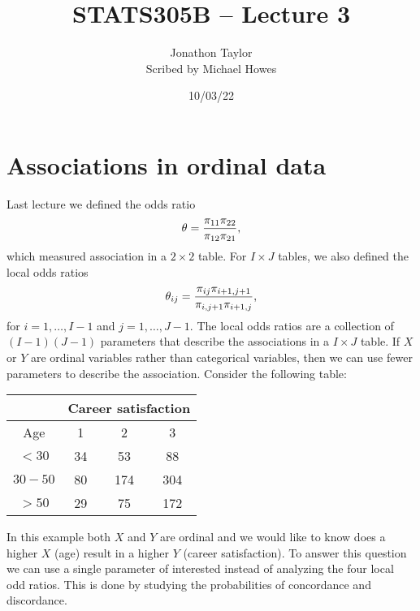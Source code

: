 




\title{STATS305B -- Lecture 3}
\author{Jonathon Taylor\\ Scribed by Michael Howes}
\date{10/03/22}

\pagestyle{fancy}
\fancyhf{}


\maketitle
\tableofcontents
\section{Associations in ordinal data}
Last lecture we defined the odds ratio
\[{\theta} = \frac{\pi_{11}\pi_{22}}{\pi_{12}\pi_{21}},\]
which measured association in a $2\times 2$ table. For $I \times J$ tables, we also defined the local odds ratios
\[{\theta}_{ij} =  \frac{\pi_{ij}\pi_{i+1,j+1}}{\pi_{i,j+1}\pi_{i+1,j}}, \]
for $i = 1,\ldots,I-1$ and $j=1,\ldots,J-1$. The local odds ratios are a collection of $(I-1)(J-1)$ parameters that describe the associations in a $I \times J$ table. If $X$ or $Y$ are ordinal variables rather than categorical variables, then we can use fewer parameters to describe the association. Consider the following table:
\begin{center}
    \begin{tabular}{c|ccc}
        &\multicolumn{3}{c}{Career satisfaction}\\
        \hline 
        Age&1&2&3\\
        \hline
        $<30$&34&53&88\\
        $30-50$&80&174&304\\
        $>50$&29&75&172
    \end{tabular}
\end{center}
In this example both $X$ and $Y$ are ordinal and we would like to know does a higher $X$ (age) result in a higher $Y$ (career satisfaction). To answer this question we can use a single parameter of interested instead of analyzing the four local odd ratios. This is done by studying the probabilities of concordance and discordance. 

